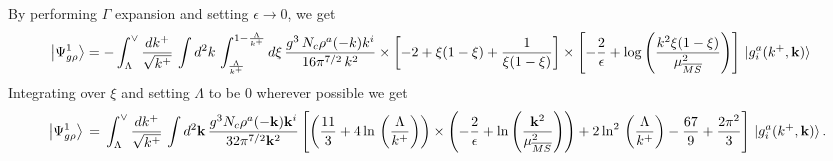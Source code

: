 \documentclass[aps,prd,amsmath,amssymb,nofootinbib]{revtex4-2}
\numberwithin{equation}{section}
\begin{document}
By performing $\Gamma$ expansion and setting $\epsilon \rightarrow 0$, we get
\begin{align}
     \left|\Psi_{g\rho}^{1}\right\rangle & = - \int_{\Lambda}^{\vee} \frac{dk^{+}}{\sqrt{k^{+}}} \,\int d^{2}k\, \int_{\frac{\Lambda}{k^{+}}}^{1-\frac{\Lambda}{k^{+}}} d\xi\, \frac{g^{3}\,N_{c}\rho^{a}(-k) k^{i}}{16\pi^{7/2}\,k^{2}}\times \left[-2+\xi(1-\xi)+\frac{1}{\xi(1-\xi)}\right]\times \left[-\frac{2}{\epsilon}+\log{\left(\frac{k^{2}\xi(1-\xi)}{\mu^{2}_{\overline{MS}}}\right)}\right]\, \ket{g^{a}_{i}(k^{+},\mathbf{k})}
\end{align}
Integrating over $\xi$ and setting $\Lambda$ to be $0$ wherever possible we get\\
\begin{align}\label{gtwoloop1}
\left|\Psi_{g\rho}^{1}\right\rangle\,=\,\int_{\Lambda}^{\vee}\frac{dk^{+}}{\sqrt{k^{+}}}\,\int d^{2}\mathbf{k}\,\frac{g^{3}N_{c}\rho^{a}(-\mathbf{k})\mathbf{k}^{i}}{32\pi^{7/2}\mathbf{k}^{2}}
\left[\left(\frac{11}{3}+4\ln\,\left(\frac{\Lambda}{k^{+}}\right)\right)\times\left(-\frac{2}{\epsilon}+\ln\left(\frac{\mathbf{k}^{2}}{\mu_{\overline{MS}}^{2}}\right)\right)+2\ln^{2}\,\left(\frac{\Lambda}{k^{+}}\right)-\frac{67}{9}+\frac{2\pi^{2}}{3}\right]\, \ket{g^{a}_{i}(k^{+},\mathbf{k})}.
\end{align}
\end{document}
